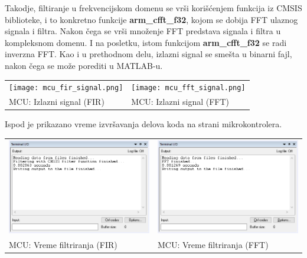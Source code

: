 \documentclass[a4paper,12pt, projekat]{etf}
\begin{document}
Takodje, filtiranje u frekvencijskom domenu se vr\v{s}i kori\v{s}\'{c}enjem funkcija iz CMSIS biblioteke, i to
konkretno funkcije \textbf{arm\_cfft\_f32}, kojom se dobija FFT ulaznog signala i filtra. Nakon \v{c}ega se vr\v{s}i
mno\v{z}enje FFT predstava signala i filtra u kompleksnom domenu. I na posletku, istom funkcijom \textbf{arm\_cfft\_f32}
se radi inverzna FFT. Kao i u prethodnom delu, izlazni signal se sme\v{s}ta u binarni fajl, nakon \v{c}ega se mo\v{z}e
porediti u MATLAB-u.

\begin{table}[h!]
	\begin{tabular}{ll}
		\texttt{[image: mcu\_fir\_signal.png]} &
		\texttt{[image: mcu\_fft\_signal.png]} \\
		MCU: Izlazni signal (FIR) &
		MCU: Izlazni signal (FFT)
	\end{tabular}
\end{table}

Ispod je prikazano vreme izvr\v{s}avanja delova koda na strani mikrokontrolera.

\begin{table}[h!]
	\begin{tabular}{ll}
		\includegraphics[scale=0.5]{mcu_fir_time.png} &
		\includegraphics[scale=0.5]{mcu_fft_time.png} \\
		MCU: Vreme filtriranja (FIR) &
		MCU: Vreme filtriranja (FFT)
	\end{tabular}
\end{table}
\end{document}
